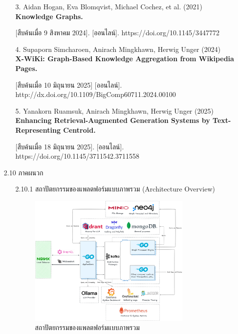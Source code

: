 \documentclass[12pt,a4paper]{article}
\begin{document}
\begin{enumerate}[leftmargin=2cm]
{\begin{enumerate}
            . [ออนไลน์]. https://doi.org/10.1145/3162957.3163014

            \item[3.] Aidan Hogan, Eva Blomqvist, Michael Cochez, et al. (2021)
            \textbf{Knowledge Graphs.}
            
            [สืบค้นเมื่อ 9 สิงหาคม 2024]. [ออนไลน์]. https://doi.org/10.1145/3447772

            \item[4.] Supaporn Simcharoen, Anirach Mingkhawn, Herwig Unger (2024) \\
            \textbf{X-WiKi: Graph-Based Knowledge Aggregation from Wikipedia Pages.}
            
            [สืบค้นเมื่อ 10 มิถุนายน 2025] [ออนไลน์]. http://dx.doi.org/10.1109/BigComp60711.2024.00100

            \item[5.] Yanakorn Ruamsuk, Anirach Mingkhawn, Herwig Unger (2025) \\
            \textbf{Enhancing Retrieval-Augmented Generation Systems by Text-Representing Centroid.}
            
            [สืบค้นเมื่อ 18 มิถุนายน 2025]. [ออนไลน์]. https://doi.org/10.1145/3711542.3711558
        \end{enumerate}
    }

    \vspace{2cm}

    \item[2.10] ภาคผนวก
    \\
    \begin{enumerate}
        \item[2.10.1] สถาปัตยกรรมของแพลตฟอร์มแบบภาพรวม (Architecture Overview)
        \begin{figure}[H]
            \centering
            \includegraphics[width=0.8\textwidth]{images/co_occurrence_knowlege_engineering_architecture_diagram.png}
            \caption{สถาปัตยกรรมของแพลตฟอร์มแบบภาพรวม}
            \label{fig:architecture_overview}
        \end{figure}


\end{enumerate}
\end{enumerate}
\end{document}
